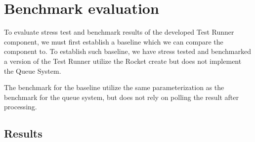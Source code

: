 \section{Benchmark evaluation}
To evaluate stress test and benchmark results of the developed Test Runner component, we must first establish a baseline which we can compare the component to. 
To establish such baseline, we have stress tested and benchmarked a version of the Test Runner utilize the Rocket create but does not implement the Queue System. 

The benchmark for the baseline utilize the same parameterization as the benchmark for the queue system, but does not rely on polling the result after processing.


\subsection{Results}
